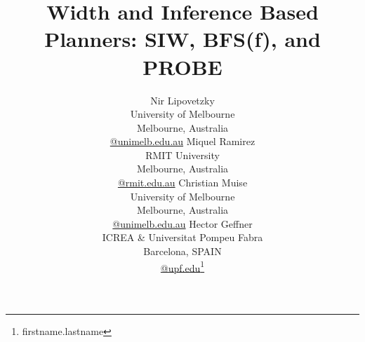 \documentclass[letterpaper]{article}
\begin{document}
\title{Width and Inference Based Planners: SIW, BFS(f), and PROBE}


\author{Nir Lipovetzky \\
      University of Melbourne \\
   Melbourne, Australia\\ 
   {\normalsize\url{@unimelb.edu.au}}
   \And
   Miquel Ramirez \\
   RMIT University \\
   Melbourne, Australia\\ 
   {\normalsize\url{@rmit.edu.au}}
   \And
   Christian Muise \\
   University of Melbourne \\
   Melbourne, Australia\\ 
   {\normalsize\url{@unimelb.edu.au}}
   \And
        Hector Geffner \\
        ICREA \&  Universitat Pompeu Fabra \\
        Barcelona, SPAIN \\
        {\normalsize\url{@upf.edu}}\footnote{firstname.lastname}
}

\maketitle


\newcommand{\tuple}[1]{{\langle #1\rangle}}
\newcommand{\triple}[1]{{\langle #1\rangle}}
\newcommand{\pair}[1]{{\langle #1\rangle}}

\newcommand{\Omit}[1]{}

\newcommand{\OmitEcai}[1]{}

\newcommand{\eqdef}{\stackrel{\hbox{\tiny{def}}}{=}}
\newcommand{\IR}{{\textit{IW}}}
\newcommand{\SR}{{\textit{SIW}}}
\newcommand{\ID}{{\textit{ID}}}

\newcommand{\BRFS}{{\textit{BrFS}}}

 \newtheorem{theorem}{Theorem}


\newtheorem{proposition}[theorem]{Proposition}
\newtheorem{lemma}[theorem]{Lemma}
\newtheorem{corollary}[theorem]{Corollary}
\newtheorem{definition}[theorem]{Definition}



\maketitle
\end{document}
